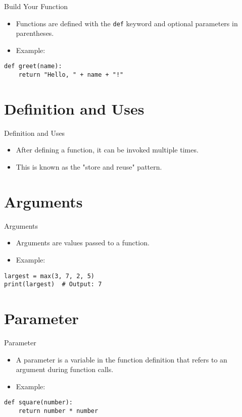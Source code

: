\documentclass[serif, aspectratio=169]{beamer}
\begin{document}
\begin{frame}[fragile]{Build Your Function}
    \begin{itemize}
        \item Functions are defined with the \texttt{def} keyword and optional parameters in parentheses.
        \item Example:
    \end{itemize}
    \begin{lstlisting}
def greet(name):
    return "Hello, " + name + "!"
    \end{lstlisting}
\end{frame}

\section{Definition and Uses}

\begin{frame}{Definition and Uses}
    \begin{itemize}
        \item After defining a function, it can be invoked multiple times.
        \item This is known as the "store and reuse" pattern.
    \end{itemize}
\end{frame}

\section{Arguments}

\begin{frame}[fragile]{Arguments}
    \begin{itemize}
        \item Arguments are values passed to a function.
        \item Example:
    \end{itemize}
    \begin{lstlisting}
largest = max(3, 7, 2, 5)
print(largest)  # Output: 7
    \end{lstlisting}
\end{frame}

\section{Parameter}

\begin{frame}[fragile]{Parameter}
    \begin{itemize}
        \item A parameter is a variable in the function definition that refers to an argument during function calls.
        \item Example:
    \end{itemize}
    \begin{lstlisting}
def square(number):
    return number * number
    \end{lstlisting}
\end{frame}
\end{document}
